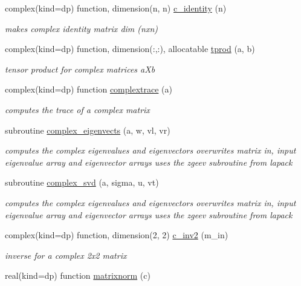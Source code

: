 \begin{DoxyCompactItemize}
complex(kind=dp) function, dimension(n, n) \hyperlink{namespaceolis__f90stdlib_a2ff3837ae1f9273552a2716064a46fce}{c\+\_\+identity} (n)
\begin{DoxyCompactList}\small\item\em makes complex identity matrix dim (nxn) \end{DoxyCompactList}\item 
complex(kind=dp) function, dimension(\+:,\+:), allocatable \hyperlink{namespaceolis__f90stdlib_af055cdf442d596810974e4f63eaeb119}{tprod} (a, b)
\begin{DoxyCompactList}\small\item\em tensor product for complex matrices a\+Xb \end{DoxyCompactList}\item 
complex(kind=dp) function \hyperlink{namespaceolis__f90stdlib_aaa6e9aabcf33a6f7052e1db5aa5dcf70}{complextrace} (a)
\begin{DoxyCompactList}\small\item\em computes the trace of a complex matrix \end{DoxyCompactList}\item 
subroutine \hyperlink{namespaceolis__f90stdlib_a71c5b363b52932a5c69053149ac8cc25}{complex\+\_\+eigenvects} (a, w, vl, vr)
\begin{DoxyCompactList}\small\item\em computes the complex eigenvalues and eigenvectors  overwrites matrix in, input eigenvalue array and eigenvector arrays uses the zgeev subroutine from lapack \end{DoxyCompactList}\item 
subroutine \hyperlink{namespaceolis__f90stdlib_a81e060e6ecfde9524a9732349a818db3}{complex\+\_\+svd} (a, sigma, u, vt)
\begin{DoxyCompactList}\small\item\em computes the complex eigenvalues and eigenvectors  overwrites matrix in, input eigenvalue array and eigenvector arrays uses the zgeev subroutine from lapack \end{DoxyCompactList}\item 
complex(kind=dp) function, dimension(2, 2) \hyperlink{namespaceolis__f90stdlib_a162dd5131a39a62d7b95e2ebca4664a4}{c\+\_\+inv2} (m\+\_\+in)
\begin{DoxyCompactList}\small\item\em inverse for a complex 2x2 matrix \end{DoxyCompactList}\item 
real(kind=dp) function \hyperlink{namespaceolis__f90stdlib_a43175b11cfecf961b5e6e597cfb2f848}{matrixnorm} (c)

\end{DoxyCompactItemize}
